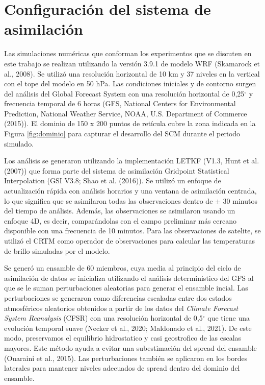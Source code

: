 \documentclass[12pt,oneside,a4paper]{reedthesis}
\begin{document}
\hypertarget{configmodelo}{%
\section{Configuración del sistema de asimilación}\label{configmodelo}}

Las simulaciones numéricas que conforman los experimentos que se discuten en este trabajo se realizan utilizando la versión 3.9.1 de modelo WRF (Skamarock et al., 2008).
Se utilizó una resolución horizontal de 10 km y 37 niveles en la vertical con el tope del modelo en 50 hPa.
Las condiciones iniciales y de contorno surgen del análisis del Global Forecast System con una resolución horizontal de 0,25\(^{\circ}\) y frecuencia temporal de 6 horas (GFS, National Centers for Environmental Prediction, National Weather Service, NOAA, U.S. Department of Commerce (2015)).
El dominio de 150 x 200 puntos de retícula cubre la zona indicada en la Figura \ref{fig:dominio} para capturar el desarrollo del SCM durante el periodo simulado.

Los análisis se generaron utilizando la implementación LETKF (V1.3, Hunt et al. (2007)) que forma parte del sistema de asimilación Gridpoint Statistical Interpolation (GSI V3.8; Shao et al. (2016)).
Se utilizó un enfoque de actualización rápida con análisis horarios y una ventana de asimilación centrada, lo que significa que se asimilaron todas las observaciones dentro de \(\pm\) 30 minutos del tiempo de análisis.
Además, las observaciones se asimilaron usando un enfoque 4D, es decir, comparándolas con el campo preliminar más cercano disponible con una frecuencia de 10 minutos.
Para las observaciones de satelite, se utilizó el CRTM como operador de observaciones para calcular las temperaturas de brillo simuladas por el modelo.

Se generó un ensamble de 60 miembros, cuya media al principio del ciclo de asimilación de datos se inicializa utilizando el análisis deterministico del GFS al que se le suman perturbaciones aleatorias para generar el ensamble incial. Las perturbaciones se generaron como diferencias escaladas entre dos estados atmosféricos aleatorios obtenidos a partir de los datos del \emph{Climate Forecast System Reanalysis} (CFSR) con una resolución horizontal de 0,5\(^{\circ}\) que tiene una evolución temporal suave (Necker et al., 2020; Maldonado et al., 2021). De este modo, preservamos el equilibrio hidrostatico y casi geostrofico de las escalas mayores. Este método ayuda a evitar una subestimación del spread del ensamble (Ouaraini et al., 2015). Las perturbaciones también se aplicaron en los bordes laterales para mantener niveles adecuados de spread dentro del dominio del ensamble.
\end{document}
